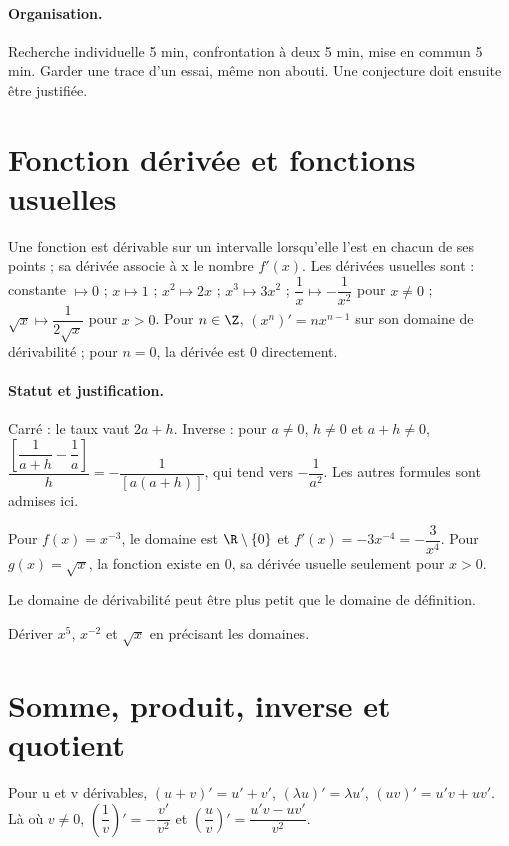 \paragraph{Organisation.} Recherche individuelle 5 min, confrontation à deux 5 min, mise en commun 5 min. Garder une trace d’un essai, même non abouti. Une conjecture doit ensuite être justifiée.
\mxnewpage
\section{Fonction dérivée et fonctions usuelles}\label{C06-U1}
\begin{keypoint}
Une fonction est dérivable sur un intervalle lorsqu’elle l’est en chacun de ses points ; sa dérivée associe à x le nombre $f\prime(x)$. Les dérivées usuelles sont : constante $\mapsto0$ ; $x\mapsto1$ ; $x^2\mapsto2x$ ; $x^3\mapsto3x^2$ ; $\dfrac{1}{x}\mapsto -\dfrac{1}{x^2}$ pour $x\ne0$ ; $\sqrt x\mapsto \dfrac{1}{2\sqrt x}$ pour $x>0$. Pour $n\in\Z$, $(x^n)\prime=nx^{n-1}$ sur son domaine de dérivabilité ; pour $n=0$, la dérivée est 0 directement.
\end{keypoint}
\paragraph{Statut et justification.} Carré : le taux vaut $2a+h$. Inverse : pour $a\ne0$, $h\ne0$ et $a+h\ne0$, $\dfrac{[\dfrac{1}{a+h}-\dfrac{1}{a}]}{h}=-\dfrac{1}{[a(a+h)]}$, qui tend vers $-\dfrac{1}{a^2}$. Les autres formules sont admises ici.
\begin{example}Pour $f(x)=x^{-3}$, le domaine est $\R\setminus\{0\}$ et $f\prime (x)=-3x^{-4}=-\dfrac{3}{x^4}$. Pour $g(x)=\sqrt x$, la fonction existe en 0, sa dérivée usuelle seulement pour $x>0$.\end{example}\label{C06-EX1}
\begin{pitfall}Le domaine de dérivabilité peut être plus petit que le domaine de définition.\end{pitfall}
\begin{application}Dériver $x^5$, $x^{-2}$ et $\sqrt x$ en précisant les domaines.\end{application}\label{C06-AP1}
\section{Somme, produit, inverse et quotient}\label{C06-U2}
\begin{keypoint}
Pour u et v dérivables, $(u+v)\prime=u\prime+v\prime$, $(\lambda u)\prime=\lambda u\prime$, $(uv)\prime=u\prime v+uv\prime$. Là où $v\ne0$, $(\dfrac{1}{v})\prime =-\dfrac{v\prime}{v^2}$ et $(\dfrac{u}{v})\prime =\dfrac{u\prime v-uv\prime}{v^2}$.
\end{keypoint}
